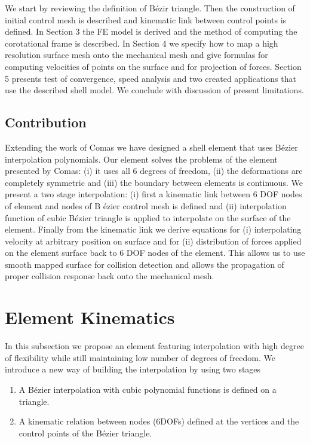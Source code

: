 \documentclass{egpubl}
\begin{document}
We start by reviewing the definition of B\'ezir triangle. Then the construction
of initial control mesh is described and  kinematic link between control points
is defined. In Section 3 the FE model is derived and the method of computing
the corotational frame is described. In Section 4 we specify how to map a high
resolution surface mesh onto the mechanical mesh and give formulas for
computing velocities of points on the surface and for projection of forces. Section
5 presents test of convergence, speed analysis and two created applications
that use the described shell model. We conclude with discussion of present
limitations.

\subsection{Contribution}

Extending the work of Comas \cite{Comas2010c} we have designed a shell element that uses B\'ezier interpolation polynomials.
Our element solves the problems of the element presented by Comas:
(i) it uses all 6 degrees of freedom,
(ii) the deformations are completely symmetric and
(iii) the boundary between elements is continuous.
We present a two stage interpolation:
(i) first a kinematic link between 6 DOF nodes of element and nodes of B \'ezier control mesh is defined and
(ii) interpolation function of cubic B\'ezier triangle is applied to interpolate on the surface of the element.
Finally from the kinematic link we derive equations for
(i) interpolating velocity at arbitrary position on surface and for
(ii) distribution of forces applied on the element surface back to 6 DOF nodes of the element.
This allows us to use smooth mapped surface for collision detection and allows the propagation of proper collision response back onto the mechanical mesh.



\section{Element Kinematics}\label{sec-kinematics} %

In this subsection we propose an element featuring interpolation with high degree of flexibility while still maintaining low number of degrees of freedom.
We introduce a new way of building the interpolation by using two stages 

\begin{enumerate}
    \item A B\'ezier interpolation with cubic polynomial functions is defined on a triangle.
    \item A kinematic relation between nodes (6DOFs) defined at the vertices and the control points of the B\'ezier triangle.
\end{enumerate}
\end{document}
